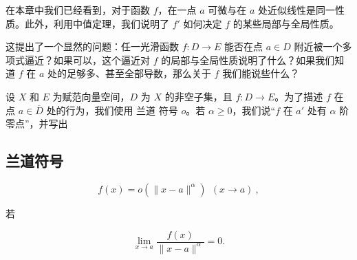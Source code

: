 在本章中我们已经看到，对于函数 $f$，在一点 $a$ 可微与在 $a$ 处近似线性是同一性质。此外，利用中值定理，我们说明了 $f'$ 如何决定 $f$ 的某些局部与全局性质。

这提出了一个显然的问题：任一光滑函数 $ f: D \to E $ 能否在点 $ a \in D $ 附近被一个多项式逼近？如果可以，这个逼近对 $ f $ 的局部与全局性质说明了什么？如果我们知道 $ f $ 在 $ a $ 处的足够多、甚至全部导数，那么关于 $ f $ 我们能说些什么？

设 $X$ 和 $E$ 为赋范向量空间，$D$ 为 $X$ 的非空子集，且 $f: D \to E$。为了描述 $f$ 在点 $a \in \overline{D}$ 处的行为，我们使用 $\mathbf{兰道}$ 符号 $o$。若 $\alpha \geq 0$，我们说“$f$ 在 $a'$ 处有 $\alpha$ 阶零点”，并写出

\subsection*{兰道符号}

\[
f(x)=o(\|x-a\|^\alpha)\ \ (x\to a)\ ,
\]

若

\[
\lim_{x\to a}\frac{f(x)}{\|x-a\|^\alpha}=0.
\]

